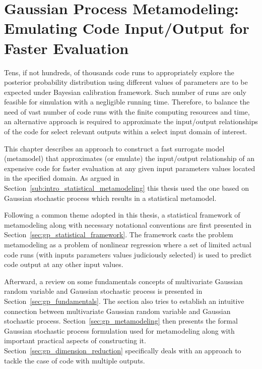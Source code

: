 \chapter[Gaussian Process Metamodeling]{Gaussian Process Metamodeling: Emulating Code Input/Output for Faster Evaluation}\label{ch:gp_metamodel}

Tens, if not hundreds, of thousands code runs to appropriately explore the posterior probability distribution using different values of parameters are to be expected under Bayesian calibration framework.
Such number of runs are only feasible for simulation with a negligible running time.
Therefore, to balance the need of vast number of code runs with the finite computing resources and time, 
an alternative approach is required to approximate the input/output relationships of the code for select relevant outputs within a select input domain of interest. 

This chapter describes an approach to construct a fast surrogate model (metamodel) that approximates (or emulate) the input/output relationship of an expensive code for faster evaluation at any given input parameters values located in the specified domain.
As argued in Section~\ref{sub:intro_statistical_metamodeling} this thesis used the one based on Gaussian stochastic process which results in a statistical metamodel. 

Following a common theme adopted in this thesis, a statistical framework of metamodeling along with necessary notational conventions are first presented in Section~\ref{sec:gp_statistical_framework}.
The framework casts the problem metamodeling as a problem of nonlinear regression where a set of limited actual code runs (with inputs parameters values judiciously selected) is used to predict code output at any other input values.

Afterward, a review on some fundamentals concepts of multivariate Gaussian random variable and Gaussian stochastic process is presented in Section~\ref{sec:gp_fundamentals}.
The section also tries to establish an intuitive connection between multivariate Gaussian random variable and Gaussian stochastic process.
Section~\ref{sec:gp_metamodeling} then presents the formal Gaussian stochastic process formulation used for metamodeling along with important practical aspects of constructing it. 
Section~\ref{sec:gp_dimension_reduction} specifically deals with an approach to tackle the case of code with multiple outputs.

